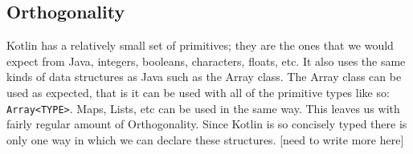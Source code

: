 \begin{center}
\section{Orthogonality}
\end{center}

\hspace{1em}Kotlin has a relatively small set of primitives; they are the ones that we would expect from Java, integers, booleans, characters, floats, etc. It also uses the same kinds of data structures as Java such as the Array class. The Array class can be used as expected, that is it can be used with all of the primitive types like so: \texttt{Array<TYPE>}. Maps, Lists, etc can be used in the same way. This leaves us with fairly regular amount of Orthogonality. Since Kotlin is so concisely typed there is only one way in which we can declare these structures. [need to write more here]